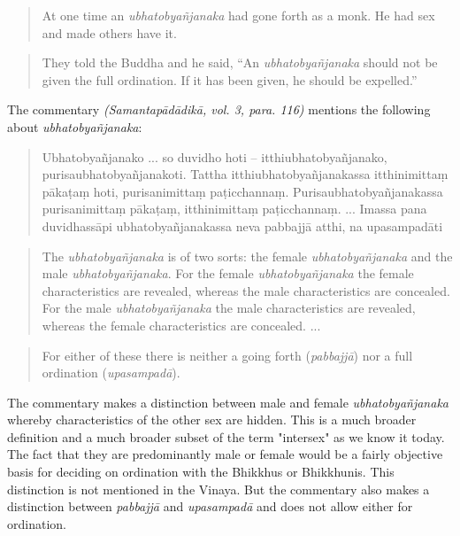 \medskip

\begin{quote}
At one time an {\em ubhatob­yañ­janaka} had gone forth as a monk. He had sex and made others have it.
\end{quote}
\begin{quote}
They told the Buddha and he said, “An {\em ubhatob­yañ­janaka} should not be given the full ordination. If it has been given, he should be expelled.”
\end{quote}

The commentary {\em (Samantapādādikā, vol. 3, para. 116)} mentions the following about {\em ubhatob­yañ­janaka}:

\begin{quote}
Ubhatobyañjanako ... so duvidho hoti – itthiubhatobyañjanako, purisaubhatobyañjanakoti. Tattha itthiubhatobyañjanakassa itthinimittaṃ pākaṭaṃ hoti, purisanimittaṃ paṭicchannaṃ. Purisaubhatobyañjanakassa purisanimittaṃ pākaṭaṃ, itthinimittaṃ paṭicchannaṃ. ... Imassa pana duvidhassāpi ubhatobyañjanakassa neva pabbajjā atthi, na upasampadāti
\end{quote}

\medskip

\begin{quote}
The {\em ubhatob­yañ­janaka} is of two sorts: the female {\em ubhatob­yañ­janaka} and the male {\em ubhatob­yañ­janaka}. For the female {\em ubhatob­yañ­janaka} the female characteristics are revealed, whereas the male characteristics are concealed. For the male {\em ubhatob­yañ­janaka} the male characteristics are revealed, whereas the female characteristics are concealed. ... 
\end{quote}
\begin{quote}
For either of these there is neither a going forth ({\em pabbajjā}) nor a full ordination ({\em upasampadā}).
\end{quote}

The commentary makes a distinction between male and female {\em ubhatob­yañ­janaka} whereby characteristics of the other sex are hidden. This is a much broader definition and a much broader subset of the term "intersex" as we know it today. The fact that they are predominantly male or female would be a fairly objective basis for deciding on ordination with the Bhikkhus or Bhikkhunis. This distinction is not mentioned in the Vinaya. But the commentary also makes a distinction between {\em pabbajjā} and {\em upasampadā} and does not allow either for ordination.




